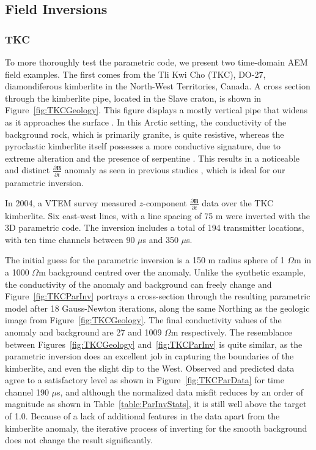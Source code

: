 \documentclass[letterpaper,11pt]{article}
\begin{document}
\subsection{Field Inversions}
\subsubsection{TKC}
To more thoroughly test the parametric code, we present two time-domain AEM field examples. The first comes from the Tli Kwi Cho (TKC), DO-27, diamondiferous kimberlite in the North-West Territories, Canada. A cross section through the kimberlite pipe, located in the Slave craton, is shown in Figure~\ref{fig:TKCGeology}. This figure displays a mostly vertical pipe that widens as it approaches the surface \cite[]{Harder2008}.  In this Arctic setting, the conductivity of the background rock, which is primarily granite, is quite resistive, whereas the pyroclastic kimberlite itself possesses a more conductive signature, due to extreme alteration and the presence of serpentine \cite[]{Pell2014}. This results in a noticeable and distinct $ \frac{\partial\mathbf{B}}{\partial t} $ anomaly as seen in previous studies \cite[]{Jansen2004}, which is ideal for our parametric inversion.  

In 2004, a VTEM survey measured $z$-component $ \frac{\partial\mathbf{B}}{\partial t} $ data over the TKC kimberlite.  Six east-west lines, with a line spacing of 75 m were inverted with the 3D parametric code.  The inversion includes a total of 194 transmitter locations, with ten time channels between 90 $ \mu $s and 350 $ \mu $s. 


The initial guess for the parametric inversion is a 150 m radius sphere of 1 $ \Omega $m in a 1000 $ \Omega $m background centred over the anomaly. Unlike the synthetic example, the conductivity of the anomaly and background can freely change and Figure~\ref{fig:TKCParInv} portrays a cross-section through the resulting parametric model after 18 Gauss-Newton iterations, along the same Northing as the geologic image from Figure~\ref{fig:TKCGeology}. The final conductivity values of the anomaly and background are 27 and 1009 $ \Omega $m respectively. The resemblance between Figures~\ref{fig:TKCGeology} and~\ref{fig:TKCParInv} is quite similar, as the parametric inversion does an excellent job in capturing the boundaries of the kimberlite, and even the slight dip to the West. Observed and predicted data agree to a satisfactory level as shown in Figure~\ref{fig:TKCParData} for time channel 190 $ \mu $s, and although the normalized data misfit reduces by an order of magnitude as shown in Table~\ref{table:ParInvStats}, it is still well above the target of 1.0. Because of a lack of additional features in the data apart from the kimberlite anomaly, the iterative process of inverting for the smooth background does not change the result significantly.
\end{document}
